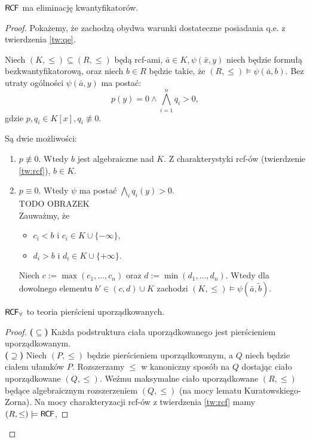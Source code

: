 \documentclass{article}
\begin{document}
\begin{tw}
	 $ \mathsf{R \mkern-1.7mu C \mkern-1.4mu F}$ ma eliminację kwantyfikatorów.
\end{tw}
\begin{proof}
	Pokażemy, że zachodzą obydwa warunki dostateczne posiadania q.e. z twierdzenia \ref{tw:qe}.
	\begin{lem} %
		 Niech $ (K, \leq) \subseteq (R, \leq)$ będą rcf-ami,
	        $ \bar{a} \in K, \psi(\bar{x}, y)$ niech będzie formułą bezkwantyfikatorową,
		oraz niech $ b \in R$ będzie takie, że $(R, \leq) \models  \psi(\bar{a}, b)$.
		Bez utraty ogólności $ \psi(\bar{a}, y)$ ma postać:
		\[
			p(y) = 0 \wedge  \bigwedge_{ i = 1 }^n q_i > 0,
		\]
		gdzie $ p, q_i \in K[x], q_i \not \equiv 0$.
	\end{lem}
	Są dwie możliwości:
	\begin{enumerate}
		\item $ p \not \equiv 0$.
			Wtedy $ b$ jest algebraiczne nad $ K$.
			Z charakterystyki rcf-ów (twierdzenie \ref{tw:rcf}), $ b \in K$.
		\item $ p \equiv 0$.
			Wtedy $ \psi$ ma postać $ \bigwedge_{ i } q_i(y) > 0$.
			\\TODO OBRAZEK\\
			Zauważmy, że
			\begin{itemize}
				\item $ c_i < b$ i $ c_i \in K \cup \{-\infty\}$,
				\item $ d_i > b$ i $ d_i \in K \cup \{+\infty\}$.
			\end{itemize}
			Niech $ c := \max (c_1, \ldots, c_n)$ oraz $ d := \min (d_1, \ldots, d_n)$.
			Wtedy dla dowolnego elementu $ b' \in (c,d) \cup K $ zachodzi $ (K, \leq) \models \psi(\bar{a},\tilde{b})$.
	\end{enumerate}
	\begin{lem}
		 $\mathsf{R \mkern-1.7mu C \mkern-1.4mu F}_{\forall}$ to teoria pierścieni uporządkowanych.
	\end{lem}
	\begin{proof}
		 \textbf{($ \subseteq$)} Każda podstruktura ciała uporządkowanego jest pierścieniem uporządkowanym.
		 \\\textbf{($ \supseteq$)} Niech $ (P, \leq)$ będzie pierścieniem uporządkowanym, a $Q$ niech będzie ciałem ułamków $P$.
		 Rozszerzamy $\leq$ w kanoniczny sposób na $Q$ dostając ciało uporządkowane $ (Q, \leq)$.
		 Weźmu maksymalne ciało uporządkowane $(R, \leq)$ będące algebraicznym rozszerzeniem $ (Q, \leq)$
		 (na mocy lematu Kuratowskiego-Zorna).
		 Na mocy charakteryzacji rcf-ów z twierdzenia \ref{tw:rcf} mamy $(R, \leq) \models \mathsf{R \mkern-1.7mu C \mkern-1.4mu F}$,

\end{proof}
\end{proof}
\end{document}
